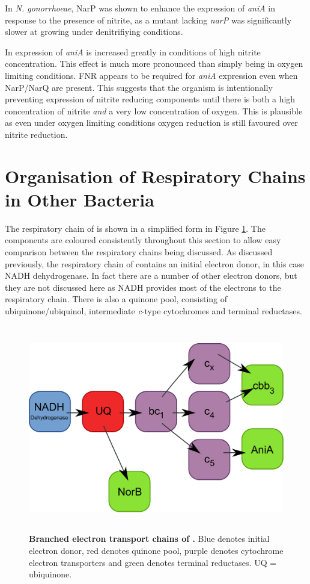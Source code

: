 In \textit{N. gonorrhoeae}, NarP was shown to enhance the expression of \textit{aniA} in response to the presence of nitrite, as a mutant lacking \textit{narP} was significantly slower at growing under denitrifiying conditions\cite{Overton2006}.

In \Nm{} expression of \textit{aniA} is increased greatly in conditions of high nitrite concentration\cite{Rock2005}. This effect is much more pronounced than simply being in oxygen limiting conditions. FNR appears to be required for \textit{aniA} expression even when NarP/NarQ are present\cite{Rock2005}. This suggests that the organism is intentionally preventing expression of nitrite reducing components until there is both a high concentration of nitrite \textit{and} a very low concentration of oxygen. This is plausible as even under oxygen limiting conditions oxygen reduction is still favoured over nitrite reduction.

\section{Organisation of Respiratory Chains in Other Bacteria}
The respiratory chain of \Nm{} is shown in a simplified form in Figure \ref{fig:nm_resp}. The components are coloured consistently throughout this section to allow easy comparison between the respiratory chains being discussed. As discussed previously, the respiratory chain of \Nm{} contains an initial electron donor, in this case NADH dehydrogenase. In fact there are a number of other electron donors, but they are not discussed here as NADH provides most of the electrons to the respiratory chain. There is also a quinone pool, consisting of ubiquinone/ubiquinol, intermediate \textit{c}-type cytochromes and terminal reductases.

\begin{figure}[tbp]
\begin{center}
	\includegraphics[height=9cm]{01-introduction/data/nm_resp.pdf}
	\caption[{\bf Branched electron transport chains of \Nm{}.}]{{\bf Branched electron transport chains of \Nm{}.} Blue denotes initial electron donor, red denotes quinone pool, purple denotes cytochrome electron transporters and green denotes terminal reductases. UQ = ubiquinone.
	\label{fig:nm_resp}}
\end{center}
\end{figure}

